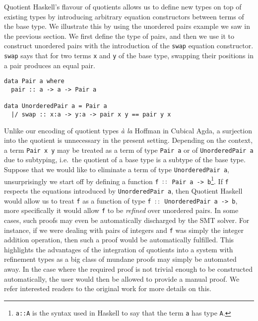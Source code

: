 \documentclass[12pt,twoside,maitrise]{dms}
\theoremstyle{definition}
\numberwithin{equation}{section}
\numberwithin{table}{chapter}
\numberwithin{figure}{chapter}
\newcommand\id[1] {\texttt{#1}}
\newcommand\fn[1] {\texttt{#1}}
\newcommand\latinphrase{\textit}
\begin{document}
Quotient Haskell's flavour of quotients allows us to define new types on top of
existing types by introducing arbitrary equation constructors between terms of
the base type. We illustrate this by using the unordered pairs example we saw in
the previous section. We first define the type of pairs, and
then we use it to construct unordered pairs with the introduction of the
\id{swap} equation constructor. \id{swap} says that for two terms \id{x} and
\id{y} of the base type, swapping their positions in a pair produces an equal
pair.

\begin{verbatim}
data Pair a where
  pair :: a -> a -> Pair a

data UnorderedPair a = Pair a
  |/ swap :: x:a -> y:a -> pair x y == pair y x
\end{verbatim}

Unlike our encoding of quotient types \latinphrase{à la}
Hoffman\cite{hofmann1995extensional} in Cubical Agda, a surjection into the
quotient is unnecessary in the present setting. Depending on the context, a term
\fn{Pair x y} may be treated as a term of type \fn{Pair a} or of
\fn{UnorderedPair a} due to subtyping, i.e.\ the quotient of a base type is a
subtype of the base type. Suppose that we would like to eliminate a term of type
\fn{UnorderedPair a}, unsurprisingly we start off by defining a function \fn{f
  ${\colon}{\colon}$ Pair a -> b}\footnote{\fn{a::A} is the syntax used in
Haskell to say that the term \id{a} has type \id{A}.}. If \id{f} respects the
equations introduced by \fn{UnorderedPair a}, then Quotient Haskell would allow
us to treat \id{f} as a function of type \fn{f ${\colon}{\colon}$ UnorderedPair
  a -> b}, more specifically it would allow \id{f} to be \emph{refined} over
unordered pairs. In some cases, such proofs may even be automatically discharged
by the SMT solver. For instance, if we were dealing with pairs of integers and
\id{f} was simply the integer addition operation, then such a proof would be
automatically fulfilled. This highlights the advantages of the integration of
quotients into a system with refinement types as a big class of mundane proofs
may simply be automated away. In the case where the required proof is not
trivial enough to be constructed automatically, the user would then be allowed
to provide a manual proof. We refer interested readers to the original work for
more details on this.
\end{document}
